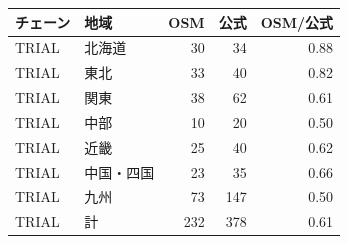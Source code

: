 \begin{tabular}{llrrr}
\toprule
チェーン & 地域 & OSM & 公式 & OSM/公式 \\
\midrule
TRIAL & 北海道 & 30 & 34 & 0.88 \\
TRIAL & 東北 & 33 & 40 & 0.82 \\
TRIAL & 関東 & 38 & 62 & 0.61 \\
TRIAL & 中部 & 10 & 20 & 0.50 \\
TRIAL & 近畿 & 25 & 40 & 0.62 \\
TRIAL & 中国・四国 & 23 & 35 & 0.66 \\
TRIAL & 九州 & 73 & 147 & 0.50 \\
\midrule
TRIAL & 計 & 232 & 378 & 0.61 \\
\bottomrule
\end{tabular}
